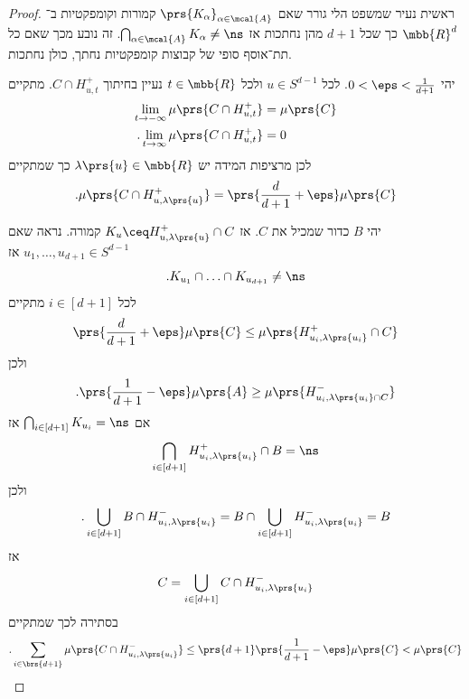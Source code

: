 \documentclass[a4paper,10pt,twoside,openany]{book}
\begin{document}
\begin{proof}
ראשית נעיר שמשפט הלי גורר שאם
$\prs{K_{\alpha}}_{\alpha \in \mcal{A}}$
קמורות וקומפקטיות ב־%
$\mbb{R}^d$
כך שכל
$d+1$
מהן נחתכות אז
$\bigcap_{\alpha \in \mcal{A}} K_\alpha \neq \ns$.
זה נובע מכך שאם כל תת־אוסף סופי של קבוצות קומפקטיות נחתך, כולן נחתכות.

יהי
$0<\eps<\frac{1}{d+1}$.
לכל
$u \in S^{d-1}$
ולכל
$t \in \mbb{R}$
נעיין בחיתוך
$C \cap H_{u,t}^+$.
מתקיים
\begin{align*}
\lim_{t\to -\infty} \mu\prs{C \cap H_{u,t}^+} &= \mu\prs{C} \\
\text{.} \lim_{t\to\infty} \mu\prs{C \cap H_{u,t}^+} &= 0
\end{align*}
לכן מרציפות המידה יש
$\lambda\prs{u} \in \mbb{R}$
כך שמתקיים
\[\text{.} \mu\prs{C \cap H_{u,\lambda\prs{u}}^+} = \prs{\frac{d}{d+1} + \eps} \mu\prs{C} \]

יהי
$B$
כדור שמכיל את
$C$.
אז
$K_u \ceq H_{u,\lambda\prs{u}}^+ \cap C$
קמורה.
נראה שאם
$u_1, \ldots, u_{d+1} \in S^{d-1}$
אז
\[ \text{.} K_{u_1} \cap \ldots \cap K_{u_{d+1}} \neq \ns\]
לכל
$i \in [d+1]$
מתקיים
\begin{align*}
\prs{\frac{d}{d+1} + \eps} \mu\prs{C} \leq \mu\prs{H^+_{u_i, \lambda\prs{u_i}} \cap C}
\end{align*}
ולכן
\begin{align*}
\text{.} \prs{\frac{1}{d+1} - \eps} \mu\prs{A} \geq \mu\prs{H^-_{u_i, \lambda\prs{u_i} \cap C}}
\end{align*}
אם
$\bigcap_{i \in [d+1]} K_{u_i} = \ns$
אז
\begin{align*}
\bigcap_{i \in [d+1]} H^+_{u_i, \lambda\prs{u_i}} \cap B = \ns
\end{align*}
ולכן
\begin{align*}
\text{.} \bigcup_{i \in [d+1]} B \cap H^-_{u_i, \lambda\prs{u_i}} = B \cap \bigcup_{i \in [d+1]} H^-_{u_i, \lambda\prs{u_i}} = B
\end{align*}
אז
\begin{align*}
C = \bigcup_{i \in [d+1]} C \cap H_{u_i, \lambda\prs{u_i}}^-
\end{align*}
בסתירה לכך שמתקיים
\begin{align*}
\text{.} \sum_{i \in \brs{d+1}} \mu\prs{C \cap H_{u_i, \lambda\prs{u_i}}^-} \leq \prs{d+1} \prs{\frac{1}{d+1} - \eps} \mu\prs{C} < \mu\prs{C}
\end{align*}


\end{proof}
\end{document}
